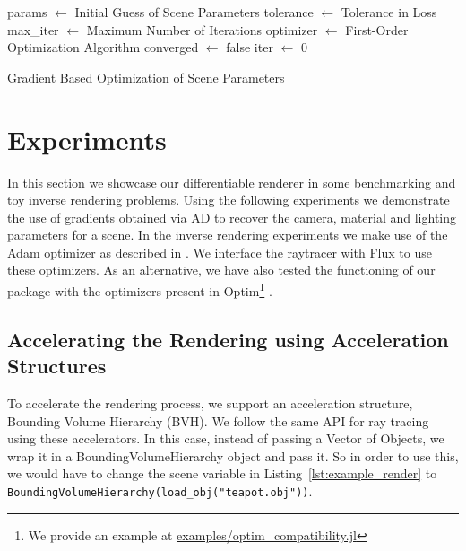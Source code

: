 \documentclass{juliacon}
\begin{document}
\begin{algorithm}[!htb]
\DontPrintSemicolon
\SetAlgoLined
{}
params $\gets$ Initial Guess of Scene Parameters\;
tolerance $\gets$ Tolerance in Loss\;
max\_iter $\gets$ Maximum Number of Iterations\;
optimizer $\gets$ First-Order Optimization Algorithm\;
converged $\gets$ false\;
iter $\gets$ 0\;
\;
\caption{Gradient Based Optimization of Scene Parameters}
\label{alg:inv_render}
\end{algorithm}

\section{Experiments}

In this section we showcase our differentiable renderer in some benchmarking and toy inverse rendering problems. Using the following experiments we demonstrate the use of gradients obtained via AD to recover the camera, material and lighting parameters for a scene. In the inverse rendering experiments we make use of the Adam optimizer as described in \cite{kingma2014adam}. We interface the raytracer with Flux to use these optimizers. As an alternative, we have also tested the functioning of our package with the optimizers present in Optim\footnote{\raggedright{We provide an example at \href{https://zenodo.org/record/1442781}{examples/optim\_compatibility.jl}}} \cite{K2018Optim}.

\subsection{Accelerating the Rendering using Acceleration Structures}

To accelerate the rendering process, we support an acceleration structure, Bounding Volume Hierarchy (BVH)\cite{Kay:1986:RTC:15922.15916}. We follow the same API for ray tracing using these accelerators. In this case, instead of passing a Vector of Objects, we wrap it in a BoundingVolumeHierarchy object and pass it. So in order to use this, we would have to change the scene variable in Listing~\ref{lst:example_render} to \lstinline{BoundingVolumeHierarchy(load_obj("teapot.obj"))}.
\end{document}
